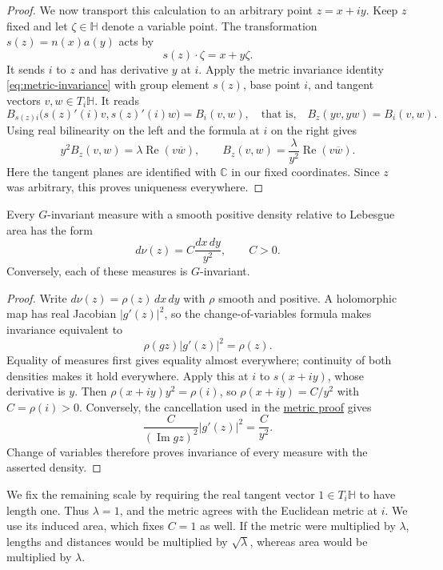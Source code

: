 \begin{proof}
We now transport this calculation to an arbitrary point $z=x+iy$. Keep $z$ fixed and let $\zeta\in\mathbb H$ denote a variable point. The transformation $s(z)=n(x)a(y)$ acts by
\[
 s(z)\cdot\zeta=x+y\zeta.
\]
It sends $i$ to $z$ and has derivative $y$ at $i$. Apply the metric invariance identity \eqref{eq:metric-invariance} with group element $s(z)$, base point $i$, and tangent vectors $v,w\in T_i\mathbb H$. It reads
\[
 B_{s(z)i}\bigl(s(z)'(i)v,s(z)'(i)w\bigr)=B_i(v,w),
 \quad\text{that is,}\quad B_z(yv,yw)=B_i(v,w).
\]
Using real bilinearity on the left and the formula at $i$ on the right gives
\[
 y^2 B_z(v,w)=\lambda\operatorname{Re}(v\overline w),
 \qquad B_z(v,w)=\frac{\lambda}{y^2}\operatorname{Re}(v\overline w).
\]
Here the tangent planes are identified with $\mathbb C$ in our fixed coordinates. Since $z$ was arbitrary, this proves uniqueness everywhere.
\end{proof}

\begin{proposition}\label{hyperbolic.invariant-density}
Every $G$-invariant measure with a smooth positive density relative to Lebesgue area has the form
\[
 d\nu(z)=C\frac{dx\,dy}{y^2},\qquad C>0.
\]
Conversely, each of these measures is $G$-invariant.
\end{proposition}

\begin{proof}
Write $d\nu(z)=\rho(z)\,dx\,dy$ with $\rho$ smooth and positive. A holomorphic map has real Jacobian $|g'(z)|^2$, so the change-of-variables formula makes invariance equivalent to
\[
 \rho(gz)|g'(z)|^2=\rho(z).
\]
Equality of measures first gives equality almost everywhere; continuity of both densities makes it hold everywhere. Apply this at $i$ to $s(x+iy)$, whose derivative is $y$. Then $\rho(x+iy)y^2=\rho(i)$, so $\rho(x+iy)=C/y^2$ with $C=\rho(i)>0$. Conversely, the cancellation used in the \hyperref[hyperbolic.invariant-geometry]{metric proof} gives
\[
 \frac{C}{(\operatorname{Im}gz)^2}|g'(z)|^2=\frac{C}{y^2}.
\]
Change of variables therefore proves invariance of every measure with the asserted density.
\end{proof}

We fix the remaining scale by requiring the real tangent vector $1\in T_i\mathbb H$ to have length one. Thus $\lambda=1$, and the metric agrees with the Euclidean metric at $i$. We use its induced area, which fixes $C=1$ as well. If the metric were multiplied by $\lambda$, lengths and distances would be multiplied by $\sqrt\lambda$, whereas area would be multiplied by $\lambda$.

